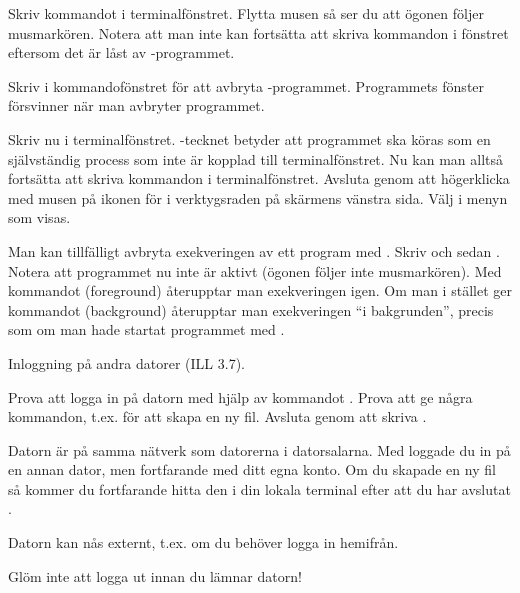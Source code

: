 \begin{Datorarbete}
	\begin{Deluppgifter}
		\item Skriv kommandot  i terminalfönstret. Flytta musen så ser du att ögonen följer musmarkören. Notera att man inte kan fortsätta att skriva kommandon i fönstret eftersom det är låst av -programmet.
		\item Skriv  i kommandofönstret för att avbryta -programmet. Programmets fönster försvinner när man avbryter programmet.
		\item Skriv nu  i terminalfönstret. \code{\&}-tecknet betyder att programmet ska köras som en självständig process som inte är kopplad till terminalfönstret. Nu kan man alltså fortsätta att skriva kommandon i terminalfönstret. Avsluta  genom att högerklicka med musen på ikonen för  i verktygsraden på skärmens vänstra sida. Välj  i menyn som visas.
		\item Man kan tillfälligt avbryta exekveringen av ett program med . Skriv  och sedan . Notera att programmet nu inte är aktivt (ögonen följer inte musmarkören). Med kommandot  (foreground) återupptar man exekveringen igen. Om man i stället ger kommandot  (background) återupptar man exekveringen \enquote{i bakgrunden}, precis som om man hade startat programmet med .
	\end{Deluppgifter}

	\item Inloggning på andra datorer (ILL 3.7).

	\begin{Deluppgifter}
		\item Prova att logga in på datorn  med hjälp av kommandot . Prova att ge några kommandon, t.ex.  för att skapa en ny fil. Avsluta genom att skriva \code{exit}.
		\item Datorn  är på samma nätverk som datorerna i datorsalarna. Med  loggade du in på en annan dator, men fortfarande med ditt egna konto. Om du skapade en ny fil så kommer du fortfarande hitta den i din lokala terminal efter att du har avslutat \code{ssh}.
		\item Datorn  kan nås externt, t.ex. om du behöver logga in hemifrån.
	\end{Deluppgifter}

	\item Glöm inte att logga ut innan du lämnar datorn!
\end{Datorarbete}